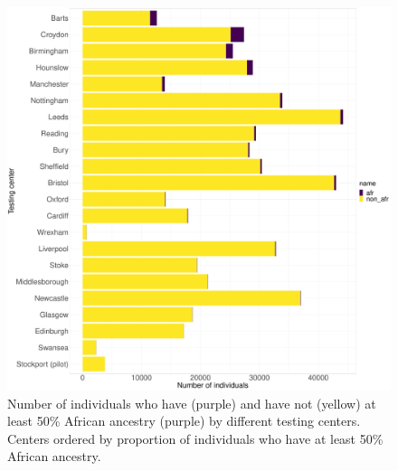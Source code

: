\begin{figure}[htp]
    \centering
    \includegraphics[width=1.0\textwidth]{../images/appendix/testing_centre_afr_prop.pdf}
    \caption{Number of individuals who have (purple) and have not (yellow) at least 50\% African ancestry (purple) by different testing centers. Centers ordered by proportion of individuals who have at least 50\% African ancestry.}
    \label{fig:testing_centre_afr_prop}
\end{figure}

